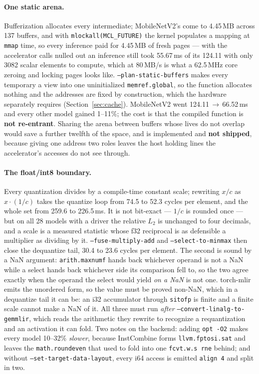 \documentclass[runningheads]{llncs}
\begin{document}
\paragraph{One static arena.} Bufferization allocates every intermediate; MobileNetV2's come to 4.45\,MB across
137 buffers, and with \texttt{mlockall(MCL\_FUTURE)} the kernel populates a mapping
at \texttt{mmap} time, so every inference paid for 4.45\,MB of fresh pages --- with
the accelerator calls nulled out an inference still took 55.67\,ms of its 124.11
with only 3082 scalar elements to compute, which at 80\,MB/s is what a 62.5\,MHz
core zeroing and locking pages looks like.
\texttt{--plan-static-buffers} makes every temporary a view into one uninitialized
\texttt{memref.global}, so the function allocates nothing and the addresses are
fixed by construction, which the hardware separately requires
(Section~\ref{sec:cache}). MobileNetV2 went 124.11\,$\to$\,66.52\,ms and every
other model gained 1--11\%; the cost is that the compiled function is \textbf{not
re-entrant}. Sharing the arena between buffers whose lives do not overlap would
save a further twelfth of the space, and is implemented and \textbf{not shipped},
because giving one address two roles leaves the host holding lines the
accelerator's accesses do not see through.

\paragraph{The float/int8 boundary.} Every quantization divides by a compile-time
constant scale; rewriting $x/c$ as $x\cdot(1/c)$ takes the quantize loop from 74.5
to 52.3 cycles per element, and the whole set from 259.6 to 226.5\,ms. It is not
bit-exact --- $1/c$ is rounded once --- but on all 28 models with a driver the
relative $L_2$ is unchanged to four decimals, and a scale is a measured statistic
whose f32 reciprocal is as defensible a multiplier as dividing by it.
\texttt{--fuse-multiply-add} and \texttt{--select-to-minmax} then close the
dequantize tail, 30.4 to 23.6 cycles per element. The second is sound by a NaN
argument: \texttt{arith.maxnumf} hands back whichever operand is not a NaN while a
select hands back whichever side its comparison fell to, so the two agree exactly
when the operand the select would yield \emph{on a NaN} is not one. torch-mlir
emits the unordered form, so the value must be proved non-NaN, which in a
dequantize tail it can be: an i32 accumulator through \texttt{sitofp} is finite and
a finite scale cannot make a NaN of it. All three must run \emph{after} \texttt{--convert-linalg-to-gemmlir}, which
reads the arithmetic they rewrite to recognize a requantization and an activation
it can fold. Two notes on the backend: adding \texttt{opt -O2} makes every model 10--32\%
\emph{slower}, because InstCombine forms \texttt{llvm.fptosi.sat} and leaves the
\texttt{math.roundeven} that used to fold into one \texttt{fcvt.w.s rne} behind;
and without \texttt{--set-target-data-layout}, every i64 access is emitted
\texttt{align 4} and split in two.
\end{document}
